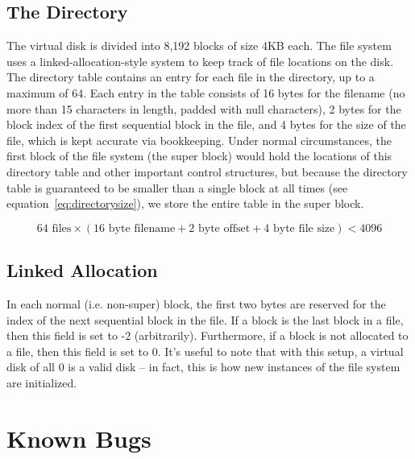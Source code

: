 \documentclass[paper=a4, fontsize=11pt]{scrartcl}
\begin{document}
\subsection*{The Directory}
The virtual disk is divided into 8,192 blocks of size 4KB each. The file system uses a linked-allocation-style system to keep track of file locations on the disk. The directory table contains an entry for each file in the directory, up to a maximum of 64. Each entry in the table consists of 16 bytes for the filename (no more than 15 characters in length, padded with null characters), 2 bytes for the block index of the first sequential block in the file, and 4 bytes for the size of the file, which is kept accurate via bookkeeping. Under normal circumstances, the first block of the file system (the super block) would hold the locations of this directory table and other important control structures, but because the directory table is guaranteed to be smaller than a single block at all times (see equation~\ref{eq:directorysize}), we store the entire table in the super block.

\begin{equation}
  \label{eq:directorysize}
  64 \textrm{ files} \times \left( 16 \textrm{ byte filename} + 2 \textrm{ byte offset} + 4 \textrm{ byte file size} \right) < 4096
\end{equation}

\subsection*{Linked Allocation}
In each normal (i.e. non-super) block, the first two bytes are reserved for the index of the next sequential block in the file. If a block is the last block in a file, then this field is set to -2 (arbitrarily). Furthermore, if a block is not allocated to a file, then this field is set to 0. It's useful to note that with this setup, a virtual disk of all 0 is a valid disk -- in fact, this is how new instances of the file system are initialized.

\section*{Known Bugs}
\end{document}
